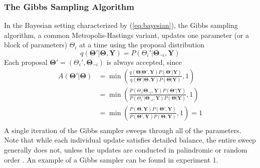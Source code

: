 \documentclass[a4paper,11pt]{article}
\begin{document}
\subsubsection{The Gibbs Sampling Algorithm}
In the Bayesian setting characterized by (\ref{eq:bayesian}), the Gibbs sampling algorithm, a common Metropolis-Hastings variant, updates one parameter (or a block of parameters) $\Theta_{i}$ at a time using the proposal distribution
\begin{equation}
    q(\mathbf{\Theta}'|\mathbf{\Theta}, \mathbf{Y}) = P(\Theta_{i}' | \mathbf{\Theta}_{\neg i}, \mathbf{Y})
\end{equation}
Each proposal $\mathbf{\Theta}' = (\Theta_{i}', \mathbf{\Theta}_{\neg i}) $ is always accepted, since
\begin{equation}
    \begin{aligned}
    A(\mathbf{\Theta}'|\mathbf{\Theta}) &= \min{\left(\frac{q(\mathbf{\Theta}|\mathbf{\Theta}', \mathbf{Y})  P(\mathbf{\Theta}'|\mathbf{Y}) }{q(\mathbf{\Theta}'|\mathbf{\Theta}, \mathbf{Y})  P(\mathbf{\Theta}| \mathbf{Y})}, 1\right)} \\
    &= \min{\left(\frac{P(\Theta_{i} | \mathbf{\Theta}_{\neg i}, \mathbf{Y})  P(\mathbf{\Theta}'|\mathbf{Y}) }{P(\Theta_{i}' | \mathbf{\Theta}_{\neg i}, \mathbf{Y})  P(\mathbf{\Theta}| \mathbf{Y})}, 1\right)} \\
    &= \min{\left(\frac{P(\mathbf{\Theta}, \mathbf{Y})  P(\mathbf{\Theta}', \mathbf{Y}) }{P(\mathbf{\Theta}', \mathbf{Y})  P(\mathbf{\Theta}, \mathbf{Y})}, 1\right)} = 1 \\
    \end{aligned}
\end{equation}
A single iteration of the Gibbs sampler sweeps through all of the parameters. Note that while each individual update satisfies detailed balance, the entire sweep generally does not, unless the updates are conducted in palindromic or random order \cite{geyer_practical_1992}. An example of a Gibbs sampler can be found in experiment 1.
\end{document}
